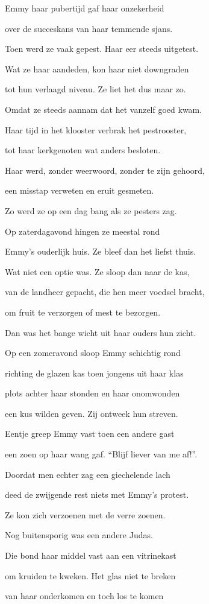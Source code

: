 Emmy haar pubertijd
gaf haar onzekerheid

over de succeskans
van haar temmende sjans.

Toen werd ze vaak gepest.
Haar eer steeds uitgetest.

Wat ze haar aandeden,
kon haar niet downgraden

tot hun verlaagd niveau.
Ze liet het dus maar zo.

Omdat ze steeds aannam
dat het vanzelf goed kwam.

Haar tijd in het klooster
verbrak het pestrooster,

tot haar kerkgenoten
wat anders besloten.

Haar werd, zonder weerwoord,
zonder te zijn gehoord,

een misstap verweten
en eruit gesmeten.

Zo werd ze op een dag
bang als ze pesters zag.

Op zaterdagavond
hingen ze meestal rond

Emmy’s ouderlijk huis.
Ze bleef dan het liefst thuis.

Wat niet een optie was.
Ze sloop dan naar de kas,

van de landheer gepacht,
die hen meer voedsel bracht,

om fruit te verzorgen
of mest te bezorgen.

Dan was het bange wicht
uit haar ouders hun zicht.

Op een zomeravond
sloop Emmy schichtig rond

richting de glazen kas
toen jongens uit haar klas

plots achter haar stonden
en haar onomwonden

een kus wilden geven.
Zij ontweek hun streven.

Eentje greep Emmy vast
toen een andere gast

een zoen op haar wang gaf.
“Blijf liever van me af!”.

Doordat men echter zag
een giechelende lach

deed de zwijgende rest
niets met Emmy’s protest.

Ze kon zich verzoenen
met de verre zoenen.

Nog buitensporig was
een andere Judas.

Die bond haar middel vast
aan een vitrinekast

om kruiden te kweken.
Het glas niet te breken

van haar onderkomen
en toch los te komen

